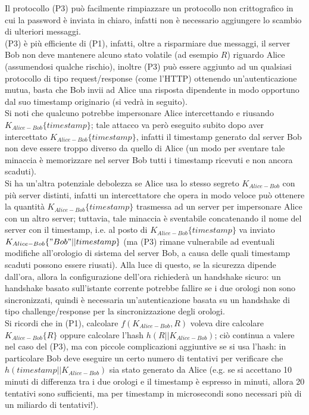 Il protocollo (P3) può facilmente rimpiazzare un protocollo non crittografico in cui la password è inviata in chiaro, infatti non è necessario aggiungere lo scambio di ulteriori messaggi.\\
(P3) è più efficiente di (P1), infatti, oltre a risparmiare due messaggi, il server Bob non deve mantenere alcuno stato volatile (ad esempio $R$) riguardo Alice (assumendosi qualche rischio), inoltre (P3) può essere aggiunto ad un qualsiasi protocollo di tipo request/response (come l'HTTP) ottenendo un'autenticazione mutua, basta che Bob invii ad Alice una risposta dipendente in modo opportuno dal suo timestamp originario (si vedrà in seguito). \\
Si noti che qualcuno potrebbe impersonare Alice intercettando e riusando $K_{Alice-Bob}\lbrace timestamp\rbrace$; tale attacco va però eseguito subito dopo aver intercettato $K_{Alice-Bob}\lbrace timestamp\rbrace$, infatti il timestamp generato dal server Bob non deve essere troppo diverso da quello di Alice (un modo per sventare tale minaccia è memorizzare nel server Bob tutti i timestamp ricevuti e non ancora scaduti). \\
Si ha un'altra potenziale debolezza se Alice usa lo stesso segreto $K_{Alice-Bob}$ con più server distinti, infatti un intercettatore che opera in modo veloce può ottenere la quantità $K_{Alice-Bob}\lbrace timestamp\rbrace$ trasmessa ad un server per impersonare Alice con un altro server; tuttavia, tale minaccia è sventabile concatenando il nome del
server con il timestamp, i.e. al posto di $K_{Alice-Bob}\lbrace timestamp\rbrace$ va inviato $K_{Alice-Bob}\lbrace "Bob"||timestamp\rbrace$ (ma (P3) rimane vulnerabile ad eventuali modifiche all'orologio di sistema del server Bob, a causa delle quali timestamp scaduti possono essere riusati). Alla luce di questo, se la sicurezza dipende dall'ora, allora la configurazione dell'ora richiederà un handshake sicuro: un handshake basato sull'istante corrente potrebbe fallire se i due orologi non sono sincronizzati, quindi è necessaria un'autenticazione basata su un handshake di tipo challenge/response per la sincronizzazione degli orologi.\\
Si ricordi che in (P1), calcolare $f(K_{Alice-Bob}, R)$ voleva dire calcolare $K_{Alice-Bob}\lbrace R\rbrace$ oppure calcolare l'hash $h(R||K_{Alice-Bob})$; ciò continua a valere nel caso del (P3), ma con piccole complicazioni aggiuntive se si usa l'hash: in particolare Bob deve eseguire un certo numero di tentativi per verificare che $h(timestamp||K_{Alice-Bob})$ sia stato generato da Alice (e.g. se si accettano 10 minuti di differenza tra i due orologi e il timestamp è espresso in minuti, allora 20 tentativi sono sufficienti, ma per timestamp in microsecondi sono necessari più di un miliardo di tentativi!).

